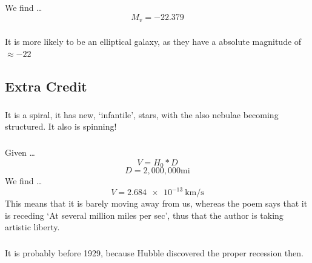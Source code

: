 \documentclass{article}
\begin{document}
We find \dots
\[\boxed{M_v = -22.379}\]

\subsubsection{}
It is more likely to be an elliptical galaxy, as they have a absolute magnitude of \(\approx -22\)



\subsection{Extra Credit}
\subsubsection{}
It is a spiral, it has new, `infantile', stars, with the also nebulae becoming structured. It also is spinning!
\subsubsection{}
Given \dots
\[V = H_0 * D\]
\[D = 2 ,000 ,000\text{mi}\]
We find \dots
\[V = \SI{2.684e-13}{\km /\s}\]
This means that it is barely moving away from us, whereas the poem says that it is receding `At several million miles per sec', thus that the author is taking artistic liberty. 
\subsubsection{}
It is probably before 1929, because Hubble discovered the proper recession then. 
\end{document}
